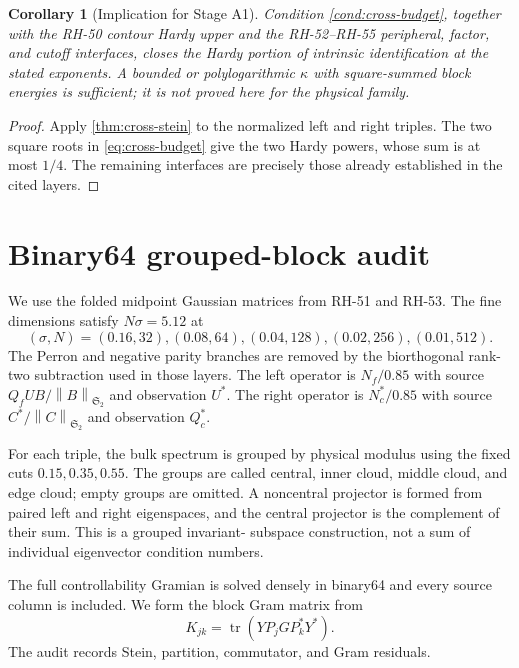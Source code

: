 \documentclass[11pt]{article}
\newtheorem{corollary}[theorem]{Corollary}
\theoremstyle{remark}
\newcommand{\norm}[1]{\left\lVert#1\right\rVert}
\newcommand{\HS}{\mathfrak S_2}
\newcommand{\tr}{\operatorname{tr}}
\begin{document}
\begin{corollary}[Implication for Stage A1]
Condition \cref{cond:cross-budget}, together with the RH-50 contour Hardy
upper and the RH-52--RH-55 peripheral, factor, and cutoff interfaces, closes
the Hardy portion of intrinsic identification at the stated exponents.  A
bounded or polylogarithmic $\kappa$ with square-summed block energies is
sufficient; it is not proved here for the physical family.
\end{corollary}

\begin{proof}
Apply \cref{thm:cross-stein} to the normalized left and right triples.  The
two square roots in \eqref{eq:cross-budget} give the two Hardy powers, whose
sum is at most $1/4$.  The remaining interfaces are precisely those already
established in the cited layers.
\end{proof}

\section{Binary64 grouped-block audit}
\label{sec:numerics}

We use the folded midpoint Gaussian matrices from RH-51 and RH-53.  The
fine dimensions satisfy $N\sigma=5.12$ at
\[
 (\sigma,N)=(0.16,32),(0.08,64),(0.04,128),(0.02,256),(0.01,512).
\]
The Perron and negative parity branches are removed by the biorthogonal
rank-two subtraction used in those layers.  The left operator is $N_f/0.85$
with source $Q_fUB/\norm B_{\HS}$ and observation $U^*$.  The right operator
is $N_c^*/0.85$ with source $C^*/\norm C_{\HS}$ and observation $Q_c^*$.

For each triple, the bulk spectrum is grouped by physical modulus using the
fixed cuts $0.15,0.35,0.55$.  The groups are called central, inner cloud,
middle cloud, and edge cloud; empty groups are omitted.  A noncentral
projector is formed from paired left and right eigenspaces, and the central
projector is the complement of their sum.  This is a grouped invariant-
subspace construction, not a sum of individual eigenvector condition
numbers.

The full controllability Gramian is solved densely in binary64 and every
source column is included.  We form the block Gram matrix from
\[
 K_{jk}=\tr(YP_jGP_k^*Y^*).
\]
The audit records Stein, partition, commutator, and Gram residuals.
\end{document}
